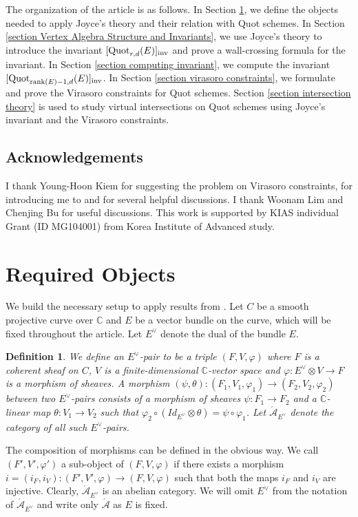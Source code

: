 \documentclass[11pt]{amsart}
\newtheorem{definition}[theorem]{Definition}
\theoremstyle{remark}
\newcommand{\C}{\mathbb{C}}
\newcommand{\Adash}{\acute{\mathcal{A}}}
\newcommand{\rk}{\textnormal{rank}}
\newcommand{\vp}[0]{\varphi}
\newcommand{\quot}[0]{\textnormal{Quot}}
\newcommand{\inv}[0]{\textnormal{inv}}
\numberwithin{theorem}{section}
\begin{document}
\vspace{.3cm}
The organization of the article is as follows.
In Section \ref{Section required objects}, we define the objects needed to apply Joyce's theory and their relation with Quot schemes.
In Section \ref{section Vertex Algebra Structure and Invariants},
we use Joyce's theory to introduce the invariant $[\quot_{r,d}(E)]_\inv$
and prove a wall-crossing formula for the invariant.
In Section \ref{section computing invariant},
we compute the invariant $[\quot_{\rk(E)-1,d}(E)]_\inv$.
In Section \ref{section virasoro constraints}, we formulate and prove the Virasoro constraints for Quot schemes.
Section \ref{section intersection theory} is used to study virtual intersections on Quot schemes using Joyce's invariant and the Virasoro constraints.

\subsection*{Acknowledgements}
I thank Young-Hoon Kiem for suggesting the problem on Virasoro constraints,
for introducing me to \cite{BLM24} and for several helpful discussions.
I thank Woonam Lim and Chenjing Bu for useful discussions.
This work is supported by KIAS individual
Grant (ID MG104001) from Korea Institute of Advanced study.

    
\section{Required Objects}\label{Section required objects}
    We build the necessary setup to apply results from \cite{Joy21}.
    Let $C$ be a smooth projective curve over $\C$ and $E$ be a vector bundle on the curve, which will be fixed throughout the article.
    Let $E^\vee$ denote the dual of the bundle $E$.
    \begin{definition}\label{Definition category of pairs}
    We define an $E^\vee$-pair to be a triple $(F,V,\vp)$ 
    where $F$ is a coherent sheaf on $C$, $V$ is a finite-dimensional $\C$-vector space and $\vp: E^\vee \otimes V \to F$ is a morphism of sheaves.
    A morphism $(\psi,\theta) : (F_1,V_1,\vp_1) \to (F_2,V_2,\vp_2)$
    between two $E^\vee$-pairs consists of a morphism of sheaves $\psi: F_1 \to F_2$
    and a $\C$-linear map $\theta : V_1 \to V_2$ such that 
    $\vp_2 \circ (Id_{E^\vee} \otimes \theta)  = \psi \circ \vp_1$.
    Let $\Adash_{E^\vee}$ denote the category of all such $E^\vee$-pairs.
    \end{definition}
    The composition of morphisms can be defined in the obvious way.
    We call $(F',V',\vp')$ a sub-object  of $(F,V,\vp)$ if there exists a morphism $i = (i_F,i_V) : (F',V',\vp) \to (F,V,\vp)$ such that both the maps $i_F$ and $i_V$ are injective.
    Clearly, $\Adash_{E^\vee}$ is an abelian category.
    We will omit $E^\vee$ from the notation of $\Adash_{E^\vee}$ and write only $\Adash$ as $E$ is fixed.
\end{document}
